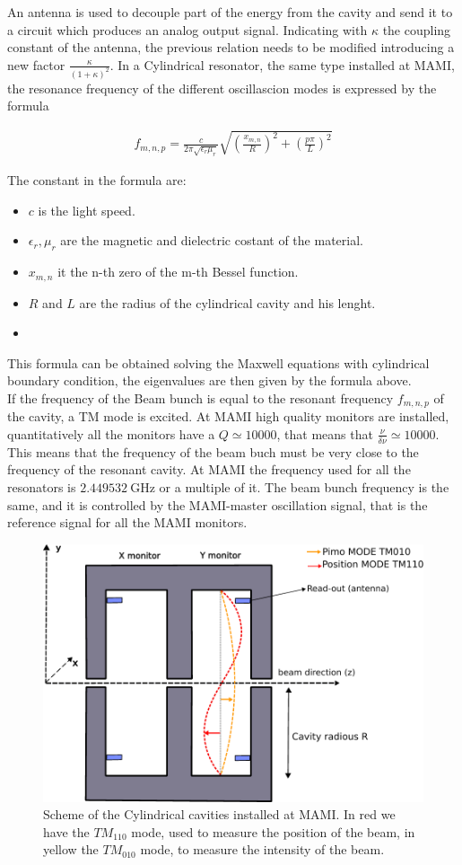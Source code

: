 An antenna is used to decouple part of the energy from the cavity and send it to a circuit which produces an analog output signal. Indicating with $\kappa$ the coupling constant of the antenna, the previous relation needs to be modified introducing a new factor $ \frac{\kappa}{(1 + \kappa)^2}$. In a Cylindrical resonator, the same type installed at MAMI, the resonance frequency of the different oscillascion modes is expressed by the formula 

\begin{align*}
f_{m,n,p} = \frac{c}{2\pi \sqrt{\epsilon_{r} \mu_{r}}} \sqrt{(\frac{x_{m,n}}{R})^{2} + (\frac{p \pi}{L})^{2}}
\end{align*}

The constant in the formula are:

\begin{itemize}
\item $c$ is the light speed.
\item $\epsilon_{r}, \mu_{r}$ are the magnetic and dielectric costant of the material.
\item $x_{m,n}$ it the n-th zero of the m-th Bessel function.
\item $R$ and $L$ are the radius of the cylindrical cavity and his lenght.
\item {}
\end{itemize}

This formula can be obtained solving the Maxwell equations with cylindrical boundary condition, the eigenvalues are then given by the formula above. \\
If the frequency of the Beam bunch is equal to the resonant frequency $f_{m,n,p}$ of the cavity, a TM mode is excited. At MAMI high quality monitors are installed, quantitatively all the monitors have a $Q \simeq 10000$, that means that $\frac{\nu}{\delta \nu} \simeq 10000$. This means that the frequency of the beam buch must be very close to the frequency of the resonant cavity. At MAMI the frequency used for all the resonators is $\SI{2.449532}{\giga \hertz}$ or a multiple of it. The beam bunch frequency is the same, and it is controlled by the MAMI-master oscillation signal, that is the reference signal for all the MAMI monitors.

\begin{figure}[hbtp]
\centering
\includegraphics[width = 0.6 \textwidth]{ExperimentalSetup/Monitors.pdf}
\caption{Scheme of the Cylindrical cavities installed at MAMI. In red we have the $TM_{110}$ mode, used to measure the position of the beam, in yellow the $TM_{010}$ mode, to measure the intensity of the beam.}
\end{figure}

